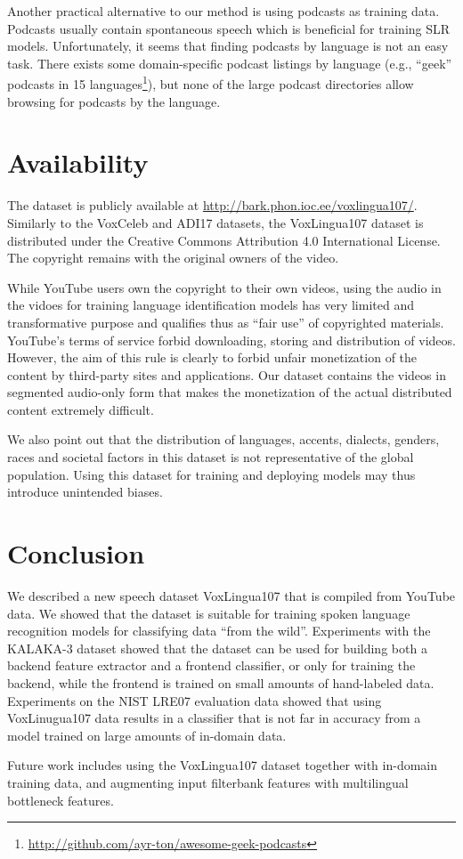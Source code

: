 \documentclass{article}
\begin{document}
Another practical alternative to our method is using podcasts as training data. 
Podcasts usually contain spontaneous speech which is beneficial for training SLR models.
Unfortunately, it seems that finding podcasts by language is not an easy task. There exists some domain-specific podcast listings by language (e.g., ``geek'' podcasts in 15 languages\footnote{\url{http://github.com/ayr-ton/awesome-geek-podcasts}}), but none of the large podcast directories allow browsing for podcasts by the language.

\section{Availability}

The dataset is publicly available at \url{http://bark.phon.ioc.ee/voxlingua107/}. Similarly to the VoxCeleb and ADI17 datasets, the VoxLingua107 dataset is distributed under the Creative Commons Attribution 4.0 International License. The copyright remains with the original owners of the video. 

While YouTube users own the copyright to their own videos, using the audio in the vidoes for training language identification models has very limited and transformative purpose and qualifies  thus as ``fair use'' of copyrighted materials. YouTube's terms of service forbid downloading, storing and distribution of videos. However, the aim of this rule is clearly to forbid unfair monetization of the content by third-party sites and applications. Our dataset contains the videos in segmented audio-only form that makes the monetization of the actual distributed content extremely difficult.

We also point out that the distribution of languages, accents, dialects, genders, races and societal factors in this dataset is not representative of the global population. Using this dataset for training and deploying models may thus introduce unintended biases.

\section{Conclusion}

We described a new speech dataset VoxLingua107 that is compiled from YouTube data. We showed that the dataset is suitable for training spoken language recognition models for classifying data ``from the wild''. Experiments with the KALAKA-3 dataset showed that the dataset can be used for building both a backend feature extractor and a frontend classifier, or only for training the backend, while the frontend is trained on small amounts of hand-labeled data.
Experiments on the NIST LRE07 evaluation data showed that using VoxLinugua107 data  results in a classifier that is not far in accuracy from a model trained on large amounts of in-domain data. 

Future work includes using the VoxLingua107 dataset together with in-domain training data, and augmenting input filterbank features with multilingual bottleneck features.





\end{document}
